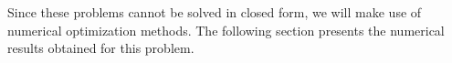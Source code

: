 Since these problems cannot be solved in closed form, we will make use
of numerical optimization methods. The following section presents the
numerical results obtained for this problem.



